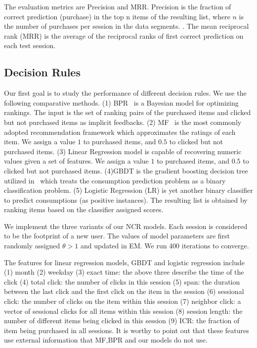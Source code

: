 \documentclass[sigconf]{acmart}
\begin{document}
The evaluation metrics are Precision and MRR. Precision is the fraction of correct prediction (purchase) in the top n items of the resulting list, where $n$ is the number of purchases per session in the data segments. . The mean reciprocal rank (MRR) is the average of the reciprocal ranks of first correct prediction on each test session.

\subsection{Decision Rules}
Our first goal is to study the performance of different decision rules. We use the following comparative methods. (1) BPR~\cite{Rendle2009BPR} is a Bayesian model for optimizing rankings. The input is the set of ranking pairs of the purchased items  and clicked but not purchased items as implicit feedbacks. (2) MF~\cite{Koren2009Matrix} is the most commonly adopted recommendation framework which approximates the ratings of each item. We assign a value $1$ to purchased items, and $0.5$ to clicked but not purchased items. (3) Linear Regression model is capable of recovering numeric values given a set of features. We assign a value $1$ to purchased items, and $0.5$ to clicked but not purchased items. (4)GBDT is the  gradient boosting decision tree utilized in~\cite{Yan2015E} which treats the consumption prediction problem as a binary classification problem. (5) Logistic Regression (LR) is yet another binary classifier to predict consumptions (as positive instances). The resulting list is obtained by ranking items based on the classifier assigned scores. 

We implement the three variants of our NCR models. Each session is considered to be the footprint of a new user.  The values of model parameters are first randomly assigned $\theta>1$ and updated in EM. We run 400 iterations to converge.


The features for linear regression models, GBDT and logistic regression include (1) month (2) weekday (3) exact time: the above three describe the time of the click (4) total click: the number of clicks in this session (5) span: the duration between the last click and the first click on the item in the session (6) sessional click: the number of clicks on the item within this session (7) neighbor click: a vector of sessional clicks for all items within this session (8) session length: the number of different items being clicked in this session (9) ICR: the fraction of item being purchased in all sessions. It is worthy to point out that these features use external information that MF,BPR and our models do not use.
\end{document}
